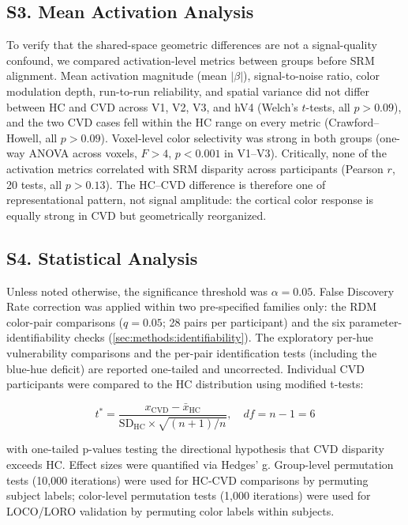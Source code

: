 \subsection*{\textbf{S3. Mean Activation Analysis}}

To verify that the shared-space geometric differences are not a signal-quality confound, we compared activation-level metrics between groups before SRM alignment. Mean activation magnitude (mean $|\beta|$), signal-to-noise ratio, color modulation depth, run-to-run reliability, and spatial variance did not differ between HC and CVD across V1, V2, V3, and hV4 (Welch's $t$-tests, all $p > 0.09$), and the two CVD cases fell within the HC range on every metric (Crawford--Howell, all $p > 0.09$). Voxel-level color selectivity was strong in both groups (one-way ANOVA across voxels, $F > 4$, $p < 0.001$ in V1--V3). Critically, none of the activation metrics correlated with SRM disparity across participants (Pearson $r$, 20 tests, all $p > 0.13$). The HC--CVD difference is therefore one of representational pattern, not signal amplitude: the cortical color response is equally strong in CVD but geometrically reorganized.



\subsection*{\textbf{S4. Statistical Analysis}}

Unless noted otherwise, the significance threshold was $\alpha = 0.05$. False Discovery Rate correction \cite{benjamini1995} was applied within two pre-specified families only: the RDM color-pair comparisons ($q = 0.05$; 28 pairs per participant) and the six parameter-identifiability checks (\cref{sec:methods:identifiability}). The exploratory per-hue vulnerability comparisons and the per-pair identification tests (including the blue-hue deficit) are reported one-tailed and uncorrected.
Individual CVD participants were compared to the HC distribution using  modified t-tests:

\begin{equation}
t^* = \frac{x_{\text{CVD}} - \bar{x}_{\text{HC}}}{\text{SD}_{\text{HC}} \times \sqrt{(n+1)/n}}, \quad df = n-1 = 6
\end{equation}

with one-tailed p-values testing the directional hypothesis that CVD disparity exceeds HC.
Effect sizes were quantified via Hedges' g.
Group-level permutation tests (10,000 iterations) were used for HC-CVD comparisons by permuting subject labels; color-level permutation tests (1,000 iterations) were used for LOCO/LORO validation by permuting color labels within subjects.



